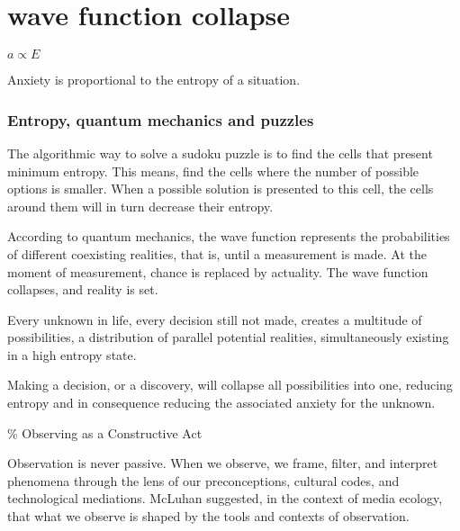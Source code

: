 \chapter*{wave function collapse}
\begin{center}
\vspace{2cm}
\begin{flushright}
\large
\textit{ $a \propto E$ }
\end{flushright}
\vspace{2cm}
\end{center}
\normalsize

Anxiety is proportional to the entropy of a situation. 

\subsection*{ Entropy, quantum mechanics and puzzles} 

The algorithmic way to solve a sudoku puzzle is to find the cells that present minimum entropy. This means, find the cells where the number of possible options is smaller. When a possible solution is presented to this cell, the cells around them will in turn decrease their entropy. 

According to quantum mechanics, the wave function represents the probabilities of different coexisting realities, that is, until a measurement is made. At the moment of measurement, chance is replaced by actuality. The wave function collapses, and reality is set.

Every unknown in life, every decision still not made, creates a multitude of possibilities, a distribution of parallel potential realities, simultaneously existing in a high entropy state. 

Making a decision, or a discovery, will collapse all possibilities into one, reducing entropy and in consequence reducing the associated anxiety for the unknown. 

{\scriptsize \textcolor{comment}{\%  Observing as a Constructive Act }}

Observation is never passive. When we observe, we frame, filter, and interpret phenomena through the lens of our preconceptions, cultural codes, and technological mediations. McLuhan suggested, in the context of media ecology, that what we observe is shaped by the tools and contexts of observation. 

